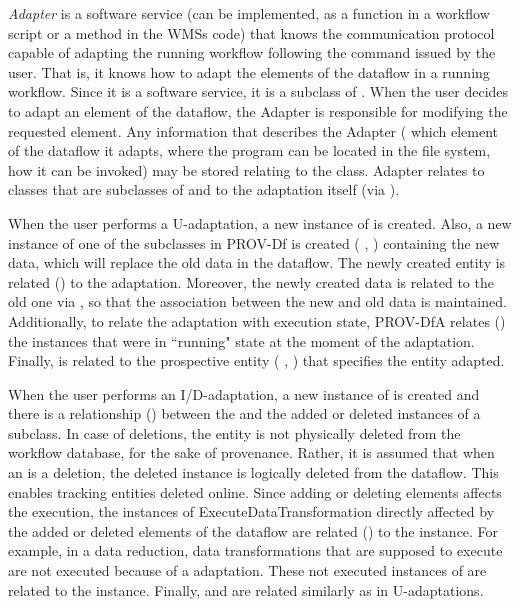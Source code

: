 \textit{Adapter} is a software service (can be implemented, \eg{} as a function in a workflow script or a method in the WMSs code)
that knows the communication protocol
capable of adapting the running workflow following the command issued by the user. That is, it knows how to adapt the elements of the
dataflow in a running workflow. Since it is a software service,
it is a subclass of .
When the user decides to adapt an element of the dataflow, the Adapter
is responsible for modifying the requested element.
Any information that describes the Adapter (\eg{}
which element of the dataflow it adapts,
where the program can be located in the file system,
how it can be invoked) may be stored relating to the  class.
Adapter relates to classes that are subclasses of  and to the
adaptation itself (via ).

When the user performs a U-adaptation, a new instance of  is created.
Also, a new instance of one of the  subclasses in PROV-Df is created
(\eg{} , ) containing the new data,
which will replace the old data in the dataflow.
The newly created entity is related () to the adaptation.
Moreover, the newly created data is related to the old one via
, so that the association between the new and old data is maintained.
Additionally, to relate the adaptation with execution state, PROV-DfA relates
() the
 instances that were in ``running"
state at the moment of the adaptation.
Finally,  is related to the prospective entity (\eg{} , )
that specifies the entity adapted.

When the user performs an I/D-adaptation, a new instance of  is created and there is a relationship () between the  and the added or deleted instances of a  subclass.
In case of deletions, the entity is not physically deleted from the workflow database,
for the sake of provenance.
Rather, it is assumed that when an  is a deletion,
the deleted instance is logically deleted from the dataflow. This enables tracking entities deleted online. Since adding or deleting elements affects the execution, the instances of ExecuteDataTransformation directly affected by the added or deleted elements of the dataflow are related () to the  instance.
For example, in a data reduction, data transformations that are supposed to execute are not executed because of a adaptation.
These not executed instances of  are related to the  instance. Finally,  and  are related similarly as in U-adaptations.

